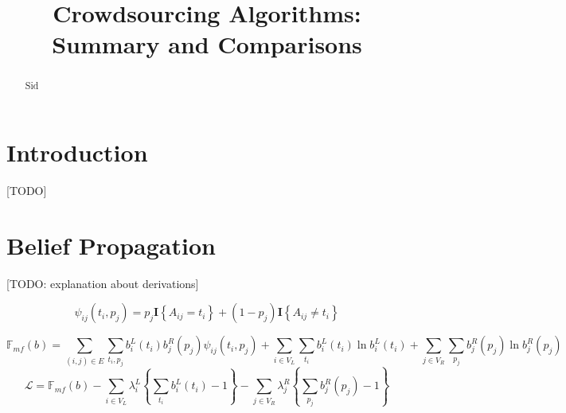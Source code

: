 \documentclass[11pt]{article}
\begin{document}
%

%





\title{Crowdsourcing Algorithms: \\Summary and Comparisons}

\maketitle

\begin{abstract}
Sid
\end{abstract}

\section{Introduction}
[TODO]

\section{Belief Propagation}
[TODO: explanation about derivations]

$$
\psi_{ij}(t_i, p_j) = p_j \mathbf{I} \left\lbrace  A_{ij}=  t_i  \right\rbrace +  (1-p_j ) \mathbf{I} \left\lbrace  A_{ij} \neq  t_i  \right\rbrace
$$

$$
\mathbb{F}_{mf}(b) = \sum_{(i, j) \in E} \sum_{t_i, p_j} b_i^L(t_i) b_j^R(p_j) \psi_{ij}(t_i, p_j) + \sum_{i \in V_L} \sum_{t_i} b_i^L(t_i)  \ln b_i^L(t_i) +  \sum_{j \in V_R} \sum_{p_j} b_j^R(p_j)  \ln b_j^R(p_j)
$$
$$
\mathcal{L} = \mathbb{F}_{mf}(b) - \sum_{i \in V_L} \lambda_i^L \left\lbrace  \sum_{t_i} b_i^L(t_i)  - 1  \right\rbrace - \sum_{j \in V_R} \lambda_j^R \left\lbrace  \sum_{p_j} b_j^R(p_j)  - 1  \right\rbrace
$$
\end{document}
